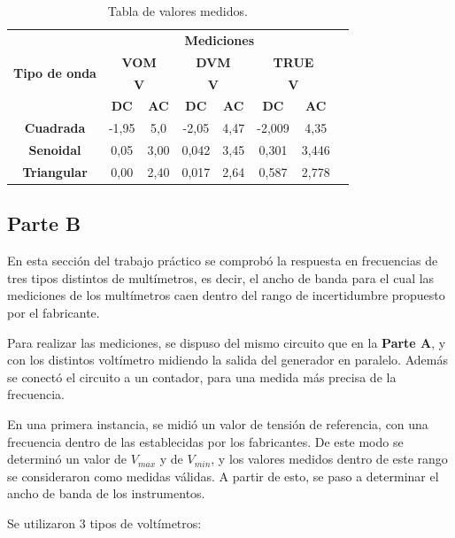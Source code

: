 \documentclass{article}
\begin{document}
\begin{table}[!hbt]
	\begin{center}

		\begin{tabular}{|c|c|c|c|c|c|c|c|} \hline
			\multirow{4}{*}{\textbf{Tipo de onda}}

			& \multicolumn{6}{c|}{\textbf{Mediciones}} \\\cline{2-7}
			& \multicolumn{2}{c|}{\textbf{VOM}} & \multicolumn{2}{c|}{\textbf{DVM}} & \multicolumn{2}{c|}{\textbf{TRUE}} \\\cline{2-7}
			& \multicolumn{2}{c|}{\textbf{V}} & \multicolumn{2}{c|}{\textbf{V}} & \multicolumn{2}{c|}{\textbf{V}} \\\cline{2-7}
			& \textbf{DC} & \textbf{AC} & \textbf{DC} & \textbf{AC} & \textbf{DC} & \textbf{AC} \\\hline
			\textbf{Cuadrada} & -1,95 & 5,0 & -2,05 & 4,47 & -2,009 & 4,35 \\\hline
			\textbf{Senoidal} & 0,05 & 3,00 & 0,042 & 3,45 & 0,301 & 3,446 \\\hline
			\textbf{Triangular} & 0,00 & 2,40 & 0,017 & 2,64 & 0,587 & 2,778 \\\hline
		\end{tabular}

	\caption{Tabla de valores medidos.}
	\end{center}
\end{table}
\bigskip



\subsection{Parte B}

	En esta sección del trabajo práctico se comprobó la respuesta en frecuencias de tres tipos distintos de multímetros, es decir, el ancho de banda para el cual las mediciones de los multímetros caen dentro del rango de incertidumbre propuesto por el fabricante.
	\par
	Para realizar las mediciones, se dispuso del mismo circuito que en la \textbf{Parte A}, y con los distintos voltímetro midiendo la salida del generador en paralelo. Además se conectó el circuito a un contador, para una medida más precisa de la frecuencia.
	\par
	En una primera instancia, se midió un valor de tensión de referencia, con una frecuencia dentro de las establecidas por los fabricantes. De este modo se determinó un valor de \textbf{$V_{max}$} y de \textbf{$V_{min}$}, y los valores medidos dentro de este rango se consideraron como medidas válidas. A partir de esto, se paso a determinar el ancho de banda de los instrumentos.
	\par
	Se utilizaron 3 tipos de voltímetros:
\bigskip
\end{document}

